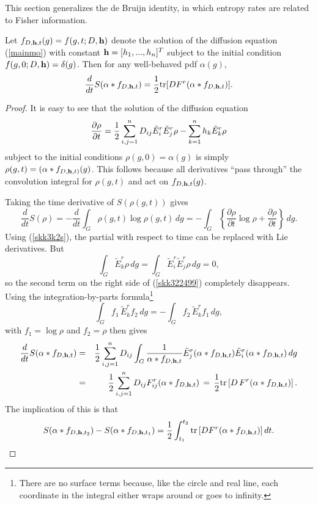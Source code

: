 \documentclass{svmult}
\def\half{ {1\over 2} }
\newcommand{\beq}{ \begin{equation}}
\newcommand{\eeq}{ \end{equation} }
\newcommand{\bea}{\begin{eqnarray*}}
\newcommand{\eea}{\end{eqnarray*}}
\begin{document}
This section generalizes the de Bruijn identity, in which entropy rates are related to
Fisher information.

\begin{theorem} \label{th7.1}
Let $f_{D, {\bf h},t}(g) = f(g,t;D,{\bf h})$ denote the solution of the diffusion
equation (\ref{mainmo}) with constant ${\bf h} = [h_1,...,h_n]^T$ subject to the initial condition $f(g,0;D,{\bf h}) = \delta(g)$.
Then for any well-behaved pdf $\alpha(g)$,
\beq
\frac{d}{dt} S(\alpha* f_{D, {\bf h},t}) = \half {\rm tr}[D F^r(\alpha * f_{D, {\bf h},t})].
\label{debru323ii205}
\eeq
\end{theorem}
\begin{proof}
It is easy to see that the solution of the diffusion equation
\beq
\frac{\partial \rho}{\partial t} = \half \sum_{i,j=1}^{n} D_{ij} \tilde{E}_i^r \tilde{E}_j^r \rho
- \sum_{k=1}^{n} h_k \tilde{E}_k^r \rho
\label{skk3k2s}
\eeq
subject to the initial conditions $\rho(g,0) = \alpha(g)$
 is simply $\rho(g,t) = (\alpha * f_{D,{\bf h},t)}(g)$. This follows
 because all derivatives ``pass through'' the convolution integral
 for $\rho(g,t)$ and act on $f_{D,{\bf h},t}(g)$.

 Taking the time derivative of $S(\rho(g,t))$ gives
\beq
\frac{d}{dt} S(\rho) = -\frac{d}{dt} \int_G \rho(g,t) \log \rho(g,t) \,dg = -\int_G \left\{
\frac{\partial \rho}{\partial t} \log \rho + \frac{\partial \rho}{\partial t} \right\} \,dg.
\label{skk322499}
\eeq
Using (\ref{skk3k2s}), the partial with respect to time can be replaced with Lie derivatives.
But
$$ \int_{G} \tilde{E}_k^r \rho \,dg = \int_{G} \tilde{E}_i^r \tilde{E}_j^r \rho \,dg = 0, $$
so the second term on the right side of (\ref{skk322499})
completely disappears. Using the integration-by-parts formula\footnote{There are no
surface terms because, like the circle and real line, each coordinate in the integral either wraps around
or goes to infinity.}
$$ \int_{G} f_1 \, \tilde{E}_k^r f_2 \,dg = - \int_{G} f_2 \, \tilde{E}_k^r f_1 \,dg, $$
with $f_1 = \log \rho$ and $f_2 = \rho$ then gives
\bea
 \frac{d}{dt} S(\alpha * f_{D,{\bf h},t}) &=& \half \sum_{i,j=1}^{n} D_{ij} \int_G  \frac{1}{\alpha * f_{D,{\bf h},t}} \tilde{E}_j^r (\alpha * f_{D,{\bf h},t}) \tilde{E}_i^r (\alpha * f_{D,{\bf h},t})\, dg \\
&=& \half \sum_{i,j=1}^{n} D_{ij} F^r_{ij}(\alpha * f_{D,{\bf h},t}) \, = \, \half {\rm tr}\left[D \, F^r(\alpha * f_{D,{\bf h},t})\right].
\eea
The implication of this is that
$$ S(\alpha * f_{D,{\bf h},t_2}) - S(\alpha * f_{D,{\bf h},t_1}) = \half \int_{t_1}^{t_2} {\rm tr}\left[D F^r(\alpha * f_{D,{\bf h},t})\right] dt. $$
\end{proof}
\end{document}
